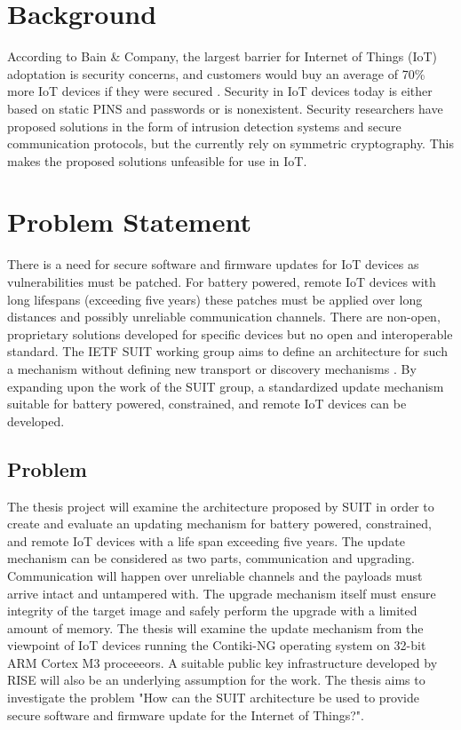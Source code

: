 \documentclass[0-thesis.tex]{subfiles}
\begin{document}
\section{Background}
According to Bain \& Company, the largest barrier for Internet of Things (IoT) adoptation is security concerns,
and customers would buy an average of 70\% more IoT devices if they were secured \parencite{ali_bosche_ford_2018}. 
Security in IoT devices today is either based on static PINS and passwords or is nonexistent. Security 
researchers have proposed solutions in the form of intrusion detection systems and secure 
communication protocols, but the currently rely on symmetric cryptography. This makes the 
proposed solutions unfeasible for use in IoT. 

\section{Problem Statement}
There is a need for secure software and firmware updates for IoT devices as vulnerabilities 
must be patched. For battery powered, remote IoT devices with long lifespans (exceeding five years) 
these patches must be applied over long distances and possibly unreliable communication channels.
There are non-open, proprietary solutions developed for specific devices but no open and 
interoperable standard. The IETF SUIT working group aims to define an architecture for such a 
mechanism without defining new transport or discovery mechanisms \parencite{suit}. By expanding upon the work of 
the SUIT group, a standardized update mechanism suitable for battery powered, constrained, and remote 
IoT devices can be developed.

\subsection{Problem}
The thesis project will examine the architecture proposed by SUIT in order to create and evaluate an 
updating mechanism for battery powered, constrained, and remote IoT devices with a life span 
exceeding five years. The update mechanism can be considered as two parts, communication and upgrading.
Communication will happen over unreliable channels and the payloads must arrive intact and untampered 
with. The upgrade mechanism itself must ensure integrity of the target image and safely perform the 
upgrade with a limited amount of memory. The thesis will examine the update mechanism from the viewpoint 
of IoT devices running the Contiki-NG operating system on 32-bit ARM Cortex M3 proceeeors. A suitable 
public key infrastructure developed by RISE will also be an underlying assumption for the work. The thesis 
aims to investigate the problem "How can the SUIT architecture be used to provide secure software and firmware 
update for the Internet of Things?".
\end{document}
